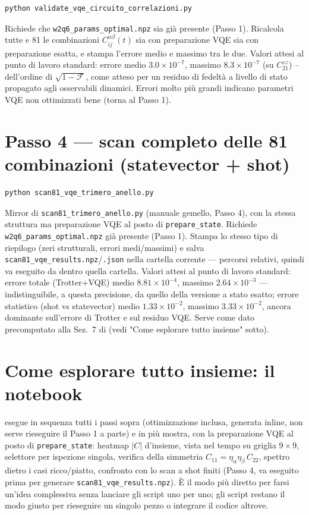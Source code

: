 \documentclass[11pt,a4paper]{article}
\begin{document}
\begin{verbatim}
python validate_vqe_circuito_correlazioni.py
\end{verbatim}
Richiede che \texttt{w2q6\_params\_optimal.npz} sia già presente (Passo 1).
Ricalcola tutte e 81 le combinazioni $C_{ij}^{\alpha\beta}(t)$ sia con
preparazione VQE sia con preparazione esatta, e stampa l'errore medio e
massimo tra le due. Valori attesi al punto di lavoro standard: errore medio
$3.0\times10^{-7}$, massimo $8.3\times10^{-7}$ (su $C_{21}^{zz}$) --
dell'ordine di $\sqrt{1-\mathcal F}$, come atteso per un residuo di fedeltà
a livello di stato propagato agli osservabili dinamici. Errori molto più
grandi indicano parametri VQE non ottimizzati bene (torna al Passo 1).

\section*{Passo 4 --- scan completo delle 81 combinazioni (statevector + shot)}

\begin{verbatim}
python scan81_vqe_trimero_anello.py
\end{verbatim}
Mirror di \texttt{scan81\_trimero\_anello.py} (manuale gemello, Passo 4), con
la stessa struttura ma preparazione VQE al posto di \texttt{prepare\_state}.
Richiede \texttt{w2q6\_params\_optimal.npz} già presente (Passo 1). Stampa lo
stesso tipo di riepilogo (zeri strutturali, errori medi/massimi) e salva
\texttt{scan81\_vqe\_results.npz}/\texttt{.json} nella cartella corrente ---
percorsi relativi, quindi va eseguito da dentro quella cartella. Valori
attesi al punto di lavoro standard: errore totale (Trotter+VQE) medio
$8.81\times10^{-4}$, massimo $2.64\times10^{-3}$ --- indistinguibile,
a questa precisione, da quello della versione a stato esatto; errore
statistico (shot vs statevector) medio $1.33\times10^{-2}$, massimo
$3.33\times10^{-2}$, ancora dominante sull'errore di Trotter e sul residuo
VQE. Serve come dato precomputato alla Sez.~7 di
\texttt{} (vedi
"Come esplorare tutto insieme" sotto).

\section*{Come esplorare tutto insieme: il notebook}

\texttt{} esegue
in sequenza tutti i passi sopra (ottimizzazione inclusa, generata inline,
non serve rieseguire il Passo 1 a parte) e in più mostra, con la
preparazione VQE al posto di \texttt{prepare\_state}: heatmap $|C|$
d'insieme, vista nel tempo su griglia $9\times9$, selettore per ispezione
singola, verifica della simmetria $C_{11}=\eta_\alpha\eta_\beta\,C_{22}$,
spettro dietro i casi ricco/piatto, confronto con lo scan a shot finiti
(Passo 4, va eseguito prima per generare \texttt{scan81\_vqe\_results.npz}).
È il modo più diretto per farsi un'idea complessiva senza lanciare gli
script uno per uno; gli script restano il modo giusto per rieseguire un
singolo pezzo o integrare il codice altrove.
\end{document}
